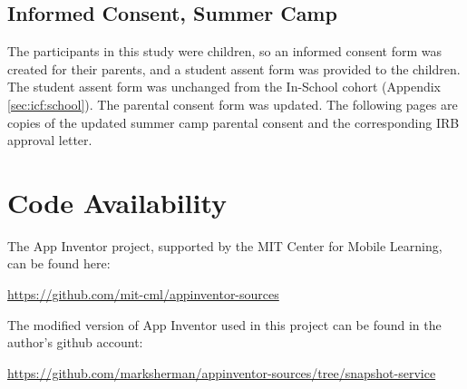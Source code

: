 \section{Informed Consent, Summer Camp}
\label{sec:icf:camp}
The participants in this study were children, so an informed consent form was created for their parents, and a student assent form was provided to the children. The student assent form was unchanged from the In-School cohort (Appendix \ref{sec:icf:school}). The parental consent form was updated. The following pages are copies of the updated summer camp parental consent and the corresponding IRB approval letter.






% 
% 


\chapter{Code Availability}

\noindent The App Inventor project, supported by the MIT Center for Mobile Learning, can be found here:

\noindent \url{https://github.com/mit-cml/appinventor-sources}

\noindent The modified version of App Inventor used in this project can be found in the author's github account:

\noindent \url{https://github.com/marksherman/appinventor-sources/tree/snapshot-service}

